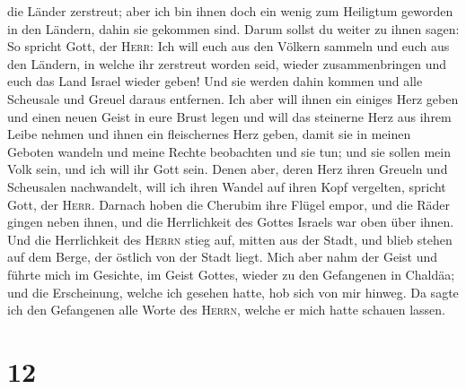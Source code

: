 die Länder zerstreut; aber ich bin ihnen doch ein wenig zum Heiligtum
geworden in den Ländern, dahin sie gekommen sind.  Darum
sollst du weiter zu ihnen sagen: So spricht Gott, der \textsc{Herr}: Ich
will euch aus den Völkern sammeln und euch aus den Ländern, in welche
ihr zerstreut worden seid, wieder zusammenbringen und euch das Land
Israel wieder geben!  Und sie werden dahin kommen und
alle Scheusale und Greuel daraus entfernen.  Ich aber
will ihnen ein einiges Herz geben und einen neuen Geist in eure Brust
legen und will das steinerne Herz aus ihrem Leibe nehmen und ihnen ein
fleischernes Herz geben,  damit sie in meinen Geboten
wandeln und meine Rechte beobachten und sie tun; und sie sollen mein
Volk sein, und ich will ihr Gott sein.  Denen aber, deren
Herz ihren Greueln und Scheusalen nachwandelt, will ich ihren Wandel auf
ihren Kopf vergelten, spricht Gott, der \textsc{Herr}. 
Darnach hoben die Cherubim ihre Flügel empor, und die Räder gingen neben
ihnen, und die Herrlichkeit des Gottes Israels war oben über ihnen.
 Und die Herrlichkeit des \textsc{Herrn} stieg auf,
mitten aus der Stadt, und blieb stehen auf dem Berge, der östlich von
der Stadt liegt.  Mich aber nahm der Geist und führte
mich im Gesichte, im Geist Gottes, wieder zu den Gefangenen in Chaldäa;
und die Erscheinung, welche ich gesehen hatte, hob sich von mir hinweg.
 Da sagte ich den Gefangenen alle Worte des
\textsc{Herrn}, welche er mich hatte schauen lassen.

\hypertarget{section-11}{%
\section{12}\label{section-11}}

